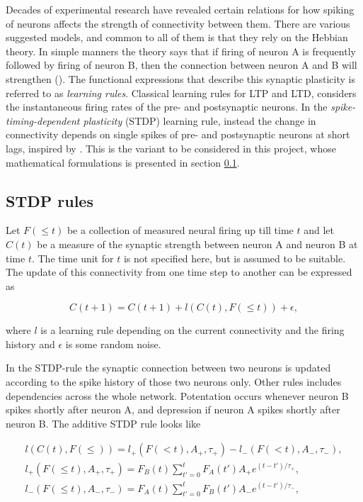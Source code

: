 Decades of experimental research have revealed certain relations for how spiking of neurons affects the strength of connectivity between them. There are various suggested models, and common to all of them is that they rely on the Hebbian theory. In simple manners the theory says that if firing of neuron A is frequently followed by firing of neuron B, then the connection between neuron A and B will strengthen (\cite{Hebb}). The functional expressions that describe this synaptic plasticity is referred to as \textit{learning rules}. Classical learning rules for LTP and LTD, considers the instantaneous firing rates of the pre- and postsynaptic neurons. In the \textit{spike-timing-dependent plasticity} (STDP) learning rule, instead the change in connectivity depends on single spikes of pre- and postsynaptic neurons at short lags, inspired by \cite{Linderman}. This is the variant to be considered in this project, whose mathematical formulations is presented in section \ref{sec:LR}.

\subsection{STDP rules}
\label{sec:LR}

Let $F(\leq t)$ be a collection of measured neural firing up till time $t$ and let $C(t)$ be a measure of the synaptic strength between neuron A and neuron B at time $t$. The time unit for $t$ is not specified here, but is assumed to be suitable. The update of this connectivity from one time step to another can be expressed as

\begin{equation}
\label{eq:LR}
    C(t+1) = C(t+1) + l(C(t), F(\leq t)) + \epsilon,
\end{equation}

where $l$ is a learning rule depending on the current connectivity and the firing history and $\epsilon$ is some random noise. 

In the STDP-rule the synaptic connection between two neurons is updated according to the spike history of those two neurons only. Other rules includes dependencies across the whole network. Potentation occurs whenever neuron B spikes shortly after neuron A, and depression if neuron A spikes shortly after neuron B. The additive STDP rule looks like

\begin{equation}
\label{eq:STDP}
    \begin{split}
    l(C(t), F(\leq)) = l_+(F(<t), A_+,\tau_+) - l_-(F(<t), A_-,\tau_-),\\ 
    l_+(F(\leq t), A_+,\tau_+) = F_B(t) \sum_{t'=0}^{t} F_A(t') A_+ e^{(t-t')/\tau_+},\\ 
    l_-(F(\leq t), A_-,\tau_-) = F_A(t) \sum_{t'=0}^{t} F_B(t') A_- e^{(t-t')/\tau_-},
    \end{split}
\end{equation}

